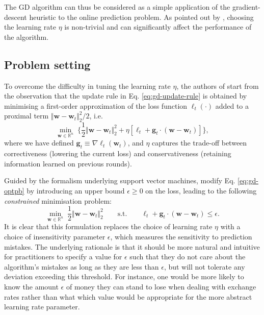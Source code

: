 The GD algorithm can thus be considered as a simple application of the gradient-descent heuristic to the online prediction problem. As pointed out by \citet{kivinen97}, choosing the learning rate $\eta$ is non-trivial and can significantly affect the performance of the algorithm.

\subsection{Problem setting}

To overcome the difficulty in tuning the learning rate $\eta$, the authors of \citep{crammer06} start from the observation that the update rule in Eq. \eqref{eq:gd-update-rule} is obtained by minimising a first-order approximation of the loss function $\ell_t(\cdot)$ added to a proximal term $\Vert\mathbf{w} - \mathbf{w}_t\Vert_2^2/2$, i.e.\
\begin{equation}
\label{eq:gd-optpb}
	\min_{\mathbf{w} \in \mathbb{R}^n} \; \Big\{\frac{1}{2}\Vert\mathbf{w} - \mathbf{w}_t\Vert_2^2 + \eta[\ell_t + \mathbf{g}_t\cdot(\mathbf{w} - \mathbf{w}_t)]\Big\},
\end{equation}
where we have defined $\mathbf{g}_t \equiv \nabla\ell_t(\mathbf{w}_t)$, and $\eta$ captures the trade-off between correctiveness (lowering the current loss) and conservativeness (retaining information learned on previous rounds).

Guided by the formalism underlying support vector machines, \citet{crammer06} modify Eq. \eqref{eq:gd-optpb} by introducing an upper bound $\epsilon \geq 0$ on the loss, leading to the following \emph{constrained} minimisation problem:
\begin{equation}
\label{eq:gpa-optpb}
	\min_{\mathbf{w} \in \mathbb{R}^n} \; \frac{1}{2}\Vert\mathbf{w} - \mathbf{w}_t\Vert_2^2
	\qquad \text{s.t.} \qquad \ell_t + \mathbf{g}_t\cdot(\mathbf{w} - \mathbf{w}_t) \leq \epsilon.
\end{equation}
It is clear that this formulation replaces the choice of learning rate $\eta$ with a choice of insensitivity parameter $\epsilon$, which measures the sensitivity to prediction mistakes. The underlying rationale is that it should be more natural and intuitive for practitioners to specify a value for $\epsilon$ such that they do not care about the algorithm's mistakes as long as they are less than $\epsilon$, but will not tolerate any deviation exceeding this threshold. For instance, one would be more likely to know the amount $\epsilon$ of money they can stand to lose when dealing with exchange rates rather than what which value would be appropriate for the more abstract learning rate parameter.

